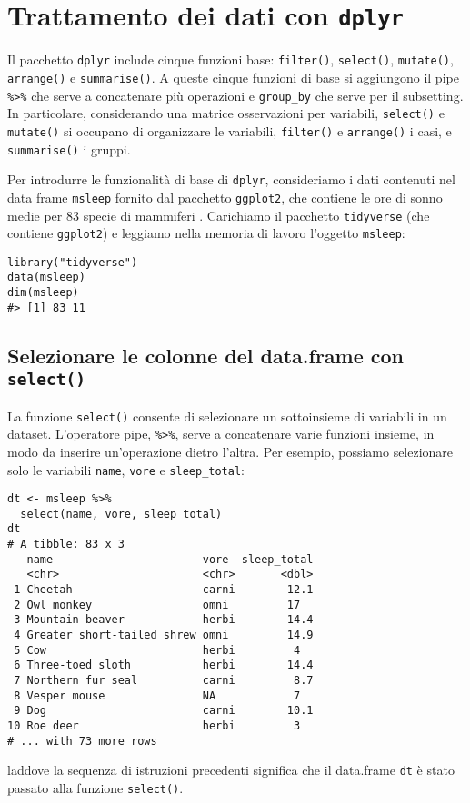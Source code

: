 \section{Trattamento dei dati con \texttt{dplyr}}

Il pacchetto \verb+dplyr+ include cinque funzioni base: 
\verb+filter()+,
\verb+select()+,
\verb+mutate()+,
\verb+arrange()+ e
\verb+summarise()+. 
A queste cinque funzioni di base si aggiungono il pipe \texttt{\%>\%} che serve a concatenare più operazioni e \texttt{group\_by} che serve per il subsetting. 
In particolare, considerando una matrice osservazioni per variabili, \texttt{select()} e \texttt{mutate()} si occupano di organizzare le variabili, \texttt{filter()} e \texttt{arrange()} i casi, e \texttt{summarise()} i gruppi. 

Per introdurre le funzionalità di base di \verb+dplyr+, consideriamo i dati contenuti nel data frame \verb+msleep+ fornito dal pacchetto \verb+ggplot2+, che contiene le ore di sonno medie per 83 specie di mammiferi \cite{savage2007scaling}.
Carichiamo il pacchetto \verb+tidyverse+ (che contiene \verb+ggplot2+) e leggiamo nella memoria di lavoro l'oggetto \verb+msleep+:
\begin{lstlisting}
library("tidyverse")
data(msleep)
dim(msleep)
#> [1] 83 11
\end{lstlisting}


\subsection{Selezionare le colonne del data.frame con \texttt{select()}}

La funzione \verb+select()+ consente di selezionare un sottoinsieme di variabili in un dataset. 
L'operatore pipe, \texttt{\%>\%}, serve a concatenare varie funzioni insieme, in modo da inserire un'operazione dietro l'altra.
Per esempio, possiamo selezionare solo le variabili \verb+name+, \verb+vore+ e \verb+sleep_total+:

\begin{lstlisting}
dt <- msleep %>%
  select(name, vore, sleep_total)
dt
# A tibble: 83 x 3
   name                       vore  sleep_total
   <chr>                      <chr>       <dbl>
 1 Cheetah                    carni        12.1
 2 Owl monkey                 omni         17  
 3 Mountain beaver            herbi        14.4
 4 Greater short-tailed shrew omni         14.9
 5 Cow                        herbi         4  
 6 Three-toed sloth           herbi        14.4
 7 Northern fur seal          carni         8.7
 8 Vesper mouse               NA            7  
 9 Dog                        carni        10.1
10 Roe deer                   herbi         3  
# ... with 73 more rows
\end{lstlisting}
\noindent
laddove la sequenza di istruzioni precedenti significa che il data.frame \verb+dt+ è stato passato alla funzione \verb+select()+.


